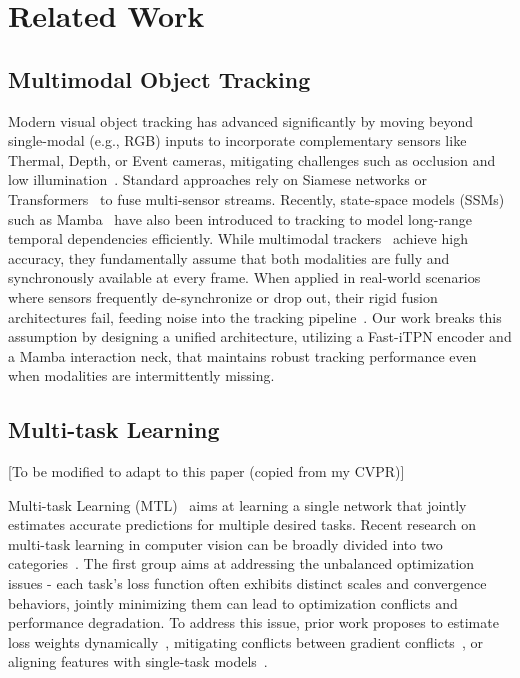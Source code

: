 \section{Related Work}
\label{sec:related_work}

\subsection{Multimodal Object Tracking}
Modern visual object tracking has advanced significantly by moving beyond single-modal (e.g., RGB) inputs to incorporate complementary sensors like Thermal, Depth, or Event cameras, mitigating challenges such as occlusion and low illumination~\cite{wang2023visevent}. Standard approaches rely on Siamese networks or Transformers~\cite{ostrack, seqtrack} to fuse multi-sensor streams. Recently, state-space models (SSMs) such as Mamba~\cite{zhu2024vision, liu2024vmamba} have also been introduced to tracking to model long-range temporal dependencies efficiently. While multimodal trackers~\cite{vipt, hou2024sdstrack, untrack} achieve high accuracy, they fundamentally assume that both modalities are fully and synchronously available at every frame. When applied in real-world scenarios where sensors frequently de-synchronize or drop out, their rigid fusion architectures fail, feeding noise into the tracking pipeline~\cite{ipt}. Our work breaks this assumption by designing a unified architecture, utilizing a Fast-iTPN encoder and a Mamba interaction neck, that maintains robust tracking performance even when modalities are intermittently missing.

\subsection{Multi-task Learning}

[To be modified to adapt to this paper (copied from my CVPR)]

Multi-task Learning (MTL)~\cite{caruana1997multitask} aims at learning a single network that jointly estimates accurate predictions for multiple desired tasks. Recent research on multi-task learning in computer vision can be broadly divided into two categories~\cite{vandenhende2021multi,ruder2017overview}. 
The first group aims at addressing the unbalanced optimization issues - each task's loss function often exhibits distinct scales and convergence behaviors, jointly minimizing them can lead to optimization conflicts and performance degradation. To address this issue, prior work proposes to estimate loss weights dynamically~\cite{kendall2018multi,liu2019end,guo2018dynamic,chen2018gradnorm,lin2019pareto,sener2018multi,liu2021towards}, mitigating conflicts between gradient conflicts~\cite{yu2020gradient,liu2021conflict,chen2020just,chennupati2019multinet++,suteu2019regularizing}, or aligning features with single-task models~\cite{li2020knowledge,li2022universal}. 

